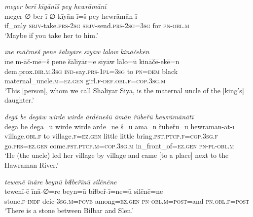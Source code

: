 \ea \label{ZP.34}
\textit{meger berī kīyānīš pey hewrāmānī} \\ 
\gll meger ∅-ber-ī ∅-kīyān-ī=š pey hewrāmān-ī \\ 
 if\_only \textsc{sbjv-}take\textsc{.prs}-\textsc{2sg} \textsc{sbjv-}send\textsc{.prs}-\textsc{2sg}\textsc{=3sg} for \textsc{pn}\textsc{-obl}\textsc{.m} \\ 
\glt `Maybe if you take her to him.'
\z 
 
\ea \label{ZP.36}
\textit{īne māčmēš pene šālīyāre sīyāw lālow kināčekēn} \\ 
\gll īne m-āč-mē=š pene šālīyār=e sīyāw lālo=ū kināčē-ekē=n \\ 
 dem.prox\textsc{.dir}\textsc{.m}\textsc{.3sg} \textsc{ind-}say\textsc{.prs}\textsc{-1pl}\textsc{=3sg} to \textsc{pn}\textsc{=dem} black maternal\_uncle\textsc{.m}\textsc{\textsc{=ez.gen}} girl\textsc{.f}\textsc{-def}\textsc{.obl}\textsc{.f}\textsc{=cop}\textsc{.3sg}\textsc{.m} \\ 
\glt `This [person], whom we call Shaliyar Siya, is the maternal uncle of the [king’s] daughter.'
\z 
 
\ea \label{ZP.41}
\textit{degā be degāw wirde wirde ārdēnešū āmān řūbeřū hewrāmānātī} \\ 
\gll degā be degā=ū wirde wirde ārdē=ne š=ū āmā=n řūbeřū=ū hewrāmān-āt-ī \\ 
 village\textsc{.obl}\textsc{.f} to village\textsc{.f}\textsc{\textsc{=ez.gen}} little little bring\textsc{.pst}\textsc{.ptcp}\textsc{.f}\textsc{=cop}\textsc{.3sg}\textsc{.f} go\textsc{.prs}\textsc{\textsc{=ez.gen}} come\textsc{.pst}\textsc{.ptcp}\textsc{.m}\textsc{=cop}\textsc{.3sg}\textsc{.m} in\_front\_of\textsc{\textsc{=ez.gen}} \textsc{pn}\textsc{\textsc{-pl}}\textsc{-obl}\textsc{.m} \\ 
\glt `He (the uncle) led her village by village and came [to a place] next to the Hawraman River.'
\z 
 
\ea \label{ZP.50}
\textit{tewenē īnāre beynū biɫbeřīnū silēnēne} \\ 
\gll tewenī-ē īnā-∅=re beyn=ū biɫbeř-ī=ne=ū silēnē=ne \\ 
 stone\textsc{.f}\textsc{-indf} deic\textsc{-3sg}\textsc{.m}\textsc{=\textsc{povb}} among\textsc{\textsc{=ez.gen}} \textsc{pn}\textsc{-obl}\textsc{.m}\textsc{=\textsc{post}}=and \textsc{pn}\textsc{.obl}\textsc{.f}\textsc{=\textsc{post}} \\ 
\glt `There is a stone between Bilbar and Slen.'
\z 
 
